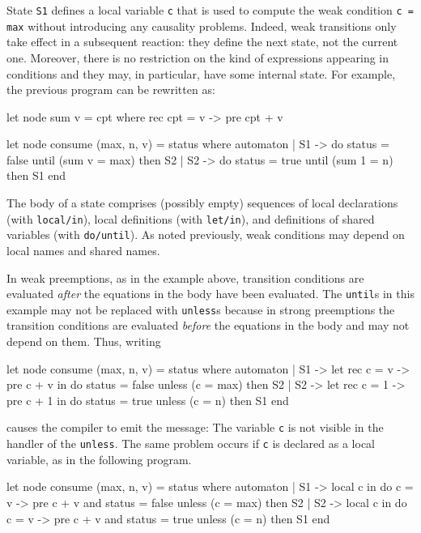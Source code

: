 \documentclass[11pt,titlepage,twoside]{report}
\makeatletter
\newcommand{\zls}[1]{{\@span{class="zelusinline"}#1}}
\newcommand{\zls}[1]{\texttt{#1}}
\renewcommand{\zls}[1]{\texttt{#1}}
\newenvironment{sample}
  {\@open{div}{\envclass@attr{zelusprompt}}
   \begin{alltt}}
  {\end{alltt}\@close{div}}
\newenvironment{sample}
  {\begin{flushright}\begin{minipage}[t]{15.3cm}\begin{alltt}\small}
  {\end{alltt}\end{minipage}\end{flushright}}
\makeatother
\begin{document}
State \zls{S1} defines a local variable \zls{c} that is used to
compute the weak condition \zls{c = max} without introducing
any causality problems. Indeed, weak transitions only take effect
in a subsequent reaction: they define the next state, not the
current one. Moreover, there is no restriction on the kind of
expressions appearing in conditions and they may, in particular, have
some internal state. For example, the previous program can be
rewritten as:
\begin{chklisting}
let node sum v = cpt where
  rec cpt = v -> pre cpt + v

let node consume (max, n, v) = status where
  automaton
  | S1 ->
       do status = false
       until (sum v = max) then S2
  | S2 ->
       do status = true
       until (sum 1 = n) then S1
  end
\end{chklisting}

The body of a state comprises (possibly empty) sequences of local declarations 
(with \zls{local/in}), local
definitions (with \zls{let/in}), and definitions of
shared variables (with \zls{do/until}). As noted previously, weak
conditions may depend on local names and shared names.

In weak preemptions, as in the example above, transition conditions are 
evaluated \emph{after} the equations in the body have been evaluated.
The \zls{until}s in this example may not be replaced with \zls{unless}s
because in strong preemptions the transition conditions are evaluated
\emph{before} the equations in the body and may not depend on them.
Thus, writing
\begin{chklisting}[fail]
let node consume (max, n, v) = status where
  automaton
  | S1 ->
      let rec c = v -> pre c + v in
      do status = false
      unless (c = max) then S2
  | S2 ->
      let rec c = 1 -> pre c + 1 in
      do status = true
      unless (c = n) then S1
  end
\end{chklisting}
causes the compiler to emit the message:
\chklistingerr{}
The variable \zls{c} is not visible in the handler of the \zls{unless}. The
same problem occurs if \zls{c} is declared as a local variable, as in the
following program.
\begin{chklisting}
let node consume (max, n, v) = status where
  automaton
  | S1 ->
      local c in
      do c = v -> pre c + v and status = false
      unless (c = max) then S2
  | S2 ->
      local c in
      do c = v -> pre c + v and status = true
      unless (c = n) then S1
  end
\end{chklisting}
\end{document}
